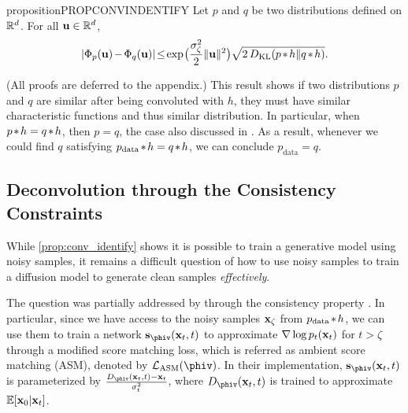 \begin{restatable}{proposition}{PROPCONVINDENTIFY}
\label{prop:conv_identify}
	Let $p$ and $q$ be two distributions defined on $\mathbb{R}^d$. For all $\mathbf{u} \in \mathbb{R}^d$, 
	\begin{align*}
			|\Phi_p(\mathbf{u})\hspace{-0.1em} -\hspace{-0.1em} \Phi_q(\mathbf{u})|\hspace{-0.15em}\leq\hspace{-0.15em} \exp\hspace{-0.1em}\big(\frac{\sigma_\zeta^2}{2} \|\mathbf{u}\|^2 \big) \sqrt{2 \,D_{\mathrm{KL}}(p \hspace{-0.1em}*\hspace{-0.1em} h\|q\hspace{-0.1em}*\hspace{-0.1em} h)}.
	\end{align*}
\end{restatable}
(All proofs are deferred to the appendix.) This result shows if two distributions $p$ and $q$ are similar after being convoluted with $h$, they must have similar characteristic functions and thus similar distribution. In particular, when $p \hspace{-0.1em}*\hspace{-0.1em} h = q \hspace{-0.1em}*\hspace{-0.1em} h$, then $p = q$, the case also discussed in \citet[Thm 2]{WangZHCZ2023}. As a result, whenever we could find $q$ satisfying $p_\text{data} \hspace{-0.1em}*\hspace{-0.1em} h = q \hspace{-0.1em}*\hspace{-0.1em} h$, we can conclude $p_\text{data} = q$.   

\subsection{Deconvolution through the Consistency Constraints}
\label{prel:deconv_through_consist_const}
While \cref{prop:conv_identify} shows it is possible to train a generative model using noisy samples, it remains a difficult question of how to use noisy samples to train a diffusion model to generate clean samples \emph{effectively}.

The question was partially addressed by \citet{DarasDD2024} through the consistency property \citep{DarasDDD2023}. In particular, since we have access to the noisy samples $\mathbf{x}_\zeta$ from $p_\text{data} \hspace{-0.1em}*\hspace{-0.1em} h$, we can use them to train a network $\sv_{\phiv}(\xv_t, t)$ to approximate $\nabla \log p_t(\mathbf{x}_t)$ for $t > \zeta$ through a modified score matching loss, which is referred as ambient score matching (ASM), denoted by $\Lc_\text{ASM}({\phiv})$. In their implementation, $\sv_{\phiv}(\xv_t, t)$ is parameterized by $\frac{D_{\phiv}(\xv_t, t) - \xv_t}{\sigma_t^2}$, where $D_{\phiv}(\xv_t, t)$ is trained to approximate $\mathbb{E}[\mathbf{x}_0 \vert \mathbf{x}_t]$. 


